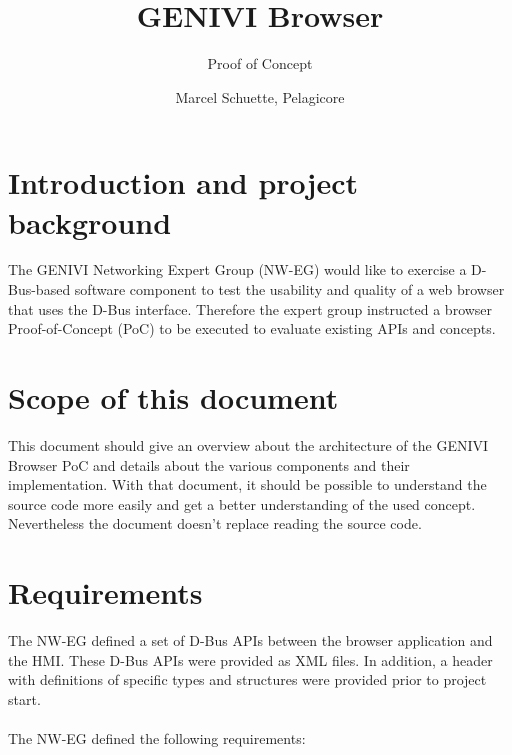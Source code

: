 \documentclass{pelagicore}
\begin{document}
\title {GENIVI Browser}
\subtitle {Proof of Concept}
\revisiondate{\today}
\author{Marcel Schuette, Pelagicore}
\filename{\jobname}
\bannerlogoheight{0.5in}
\usefrontmetadatatrue
{}

\maketitle
\tableofcontents \clearpage

\section{Introduction and project background}
The GENIVI Networking Expert Group (NW-EG) would like to exercise a D-Bus-based
software component to test the usability and quality of a web browser that uses
the D-Bus interface. Therefore the expert group instructed a browser
Proof-of-Concept (PoC) to be executed to evaluate existing APIs and concepts.

\section{Scope of this document}

This document should give an overview about the architecture of the GENIVI
Browser PoC and details about the various components and their implementation.
With that document, it should be possible to understand the source code more
easily and get a better understanding of the used concept. Nevertheless the
document doesn’t replace reading the source code.

\section{Requirements}

The NW-EG defined a set of D-Bus APIs between the browser application and the
HMI.  These D-Bus APIs were provided as XML files. In addition, a header with
definitions of specific types and structures were provided prior to project
start.
\\\\
The NW-EG defined the following requirements:
\end{document}
